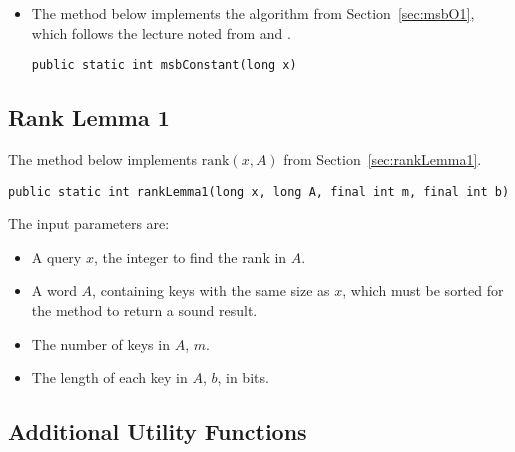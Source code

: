 \begin{itemize}
    \item
    The method below implements the algorithm from Section~\ref{sec:msbO1}, which follows the lecture noted from \cite{erikdemainelec12} and \cite{nelsonjelanilec2}.
    \begin{lstlisting}
public static int msbConstant(long x)
    \end{lstlisting}
    
\end{itemize}

\subsection{Rank Lemma 1} \label{sec:rankLemma1Implementation}

The method below implements $\text{rank}(x,A)$ from Section~\ref{sec:rankLemma1}.
\begin{lstlisting}
public static int rankLemma1(long x, long A, final int m, final int b)
\end{lstlisting}
The input parameters are:
\begin{itemize}
    \item
    A query $x$, the integer to find the rank in $A$.
    
    \item
    A word $A$, containing keys with the same size as $x$, which must be sorted for the method to return a sound result.
    
    \item
    The number of keys in $A$, $m$.
    
    \item
    The length of each key in $A$, $b$, in bits.
\end{itemize}

\subsection{Additional Utility Functions}

